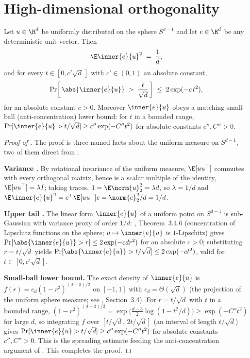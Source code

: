 \section{High-dimensional orthogonality}
\label{sec:orthogonality}

\begin{lemma}
\label{lem:orthogonality}
Let $u\in\R^d$ be uniformly distributed on the sphere $S^{d-1}$ and let
$e\in\R^d$ be any deterministic unit vector. Then
\begin{align}\label{eq:orthogonality_variance}
   \E\inner{e}{u}^2 \;=\; \frac1d,
\end{align}
and for every $t\in[0,c'\sqrt d\,]$ with $c'\in(0,1)$ an absolute
constant,
\begin{align}\label{eq:orthogonality_tail}
   \Pr\!\left[\, \abs{\inner{e}{u}} \;>\; \frac{t}{\sqrt d} \,\right]
   \;\le\; 2\exp(-c\,t^2),
\end{align}
for an absolute constant $c>0$. Moreover $\inner{e}{u}$ obeys a matching
small-ball (anti-concentration) lower bound: for $t$ in a bounded range,
$\Pr[\inner{e}{u}>t/\sqrt d]\ge c''\exp(-C''t^2)$ for absolute constants
$c'',C''>0$.
\end{lemma}

\begin{proof}[Proof of ]
The proof is three named facts about the uniform measure on $S^{d-1}$, two
of them direct from \cite{vershynin2018}.

\smallskip\noindent\textbf{Variance .} By
rotational invariance of the uniform measure, $\E[uu^\top]$ commutes with
every orthogonal matrix, hence is a scalar multiple of the identity,
$\E[uu^\top]=\lambda I$; taking traces, $1=\E\norm{u}_2^2=\lambda d$, so
$\lambda=1/d$ and $\E\inner{e}{u}^2=e^\top\E[uu^\top]e=\norm{e}_2^2/d=1/d$.

\smallskip\noindent\textbf{Upper tail .} The
linear form $\inner{e}{u}$ of a uniform point on $S^{d-1}$ is sub-Gaussian
with variance proxy of order $1/d$: \cite{vershynin2018}, Theorem~3.4.6
(concentration of Lipschitz functions on the sphere; $u\mapsto\inner{e}{u}$
is $1$-Lipschitz) gives $\Pr[\abs{\inner{e}{u}}>r]\le2\exp(-c d r^2)$ for an
absolute $c>0$; substituting $r=t/\sqrt d$ yields
$\Pr[\abs{\inner{e}{u}}>t/\sqrt d]\le2\exp(-c t^2)$, valid for
$t\in[0,c'\sqrt d]$.

\smallskip\noindent\textbf{Small-ball lower bound.} The exact density of
$\inner{e}{u}$ is $f(r)=c_d(1-r^2)^{(d-3)/2}$ on $[-1,1]$ with
$c_d=\Theta(\sqrt d)$ (the projection of the uniform sphere measure; see
\cite{vershynin2018}, Section~3.4). For $r=t/\sqrt d$ with $t$ in a bounded
range, $(1-r^2)^{(d-3)/2}=\exp\bigl(\tfrac{d-3}{2}\log(1-t^2/d)\bigr)\ge\exp(-C''t^2)$
for large $d$, so integrating $f$ over $[t/\sqrt d,\,2t/\sqrt d]$ (an
interval of length $t/\sqrt d$) gives
$\Pr[\inner{e}{u}>t/\sqrt d]\ge c''\exp(-C''t^2)$ for absolute constants
$c'',C''>0$. This is the spreading estimate feeding the anti-concentration
argument of . This completes the proof.
\end{proof}

